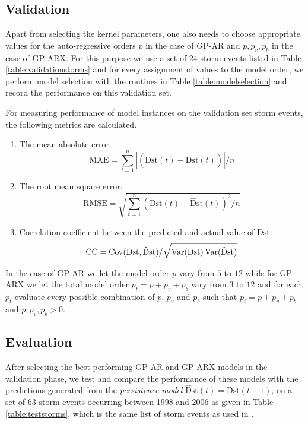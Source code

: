 \subsection*{Validation}

Apart from selecting the kernel parameters, one also needs to choose appropriate values for the auto-regressive orders $p$ in the case of GP-AR and $p, p_v, p_b$ in the case of GP-ARX. For this purpose we use a set of 24 storm events listed in Table \ref{table:validationstorms} and for every assignment of values to the model order, we perform model selection with the routines in Table \ref{table:modelselection} and record the performance on this validation set.

For measuring performance of model instances on the validation set storm events, the following metrics are calculated.

\begin{enumerate}
    \item The mean absolute error.
    \begin{equation}
        \mathrm{MAE} = \sum_{t=1}^{n} \left |(\mathrm{Dst}(t) - \mathrm{\hat{D}st}(t)) \right | / n
    \end{equation}
    \item The root mean square error.
    \begin{equation}
        \mathrm{RMSE} = \sqrt{\sum_{t=1}^{n} (\mathrm{Dst}(t) - \mathrm{\hat{D}st}(t))^2 / n}
    \end{equation}
    \item Correlation coefficient between the predicted and actual value of $ \mathrm{Dst}$.
    \begin{equation}
        \mathrm{CC} = \operatorname*{Cov}(\mathrm{Dst}, \mathrm{\hat{D}st})/\sqrt{\operatorname*{Var}(\mathrm{Dst}) \operatorname*{Var}(\mathrm{\hat{D}st})}
    \end{equation}
\end{enumerate}


In the case of GP-AR we let the model order $p$ vary from $5$ to $12$ while for GP-ARX we let the total model order $p_t = p + p_v + p_b$ vary from $3$ to $12$ and for each $p_t$ evaluate every possible combination of $p$, $p_v$ and $p_b$ such that $p_t = p + p_v + p_b$ and $p, p_{v}, p_b > 0$.

\subsection*{Evaluation}\label{sec:gpOSAEval}

After selecting the best performing GP-AR and GP-ARX models in the validation phase, we test and compare the performance of these models with the predictions generated from the \emph{persistence model} 
$\mathrm{\hat{D}st}(t) = \mathrm{Dst}(t-1)$, on a set of 63 storm events occurring between 1998 and 2006 as given in Table \ref{table:teststorms}, which is the same list of storm events as used in \citet{Ji2012}.


